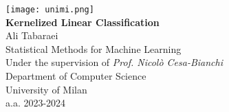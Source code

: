 
\newcommand{\ProjectTitle}{Kernelized Linear Classification}
\newcommand{\AuthorName}{Ali Tabaraei}
\newcommand{\CourseName}{Statistical Methods for Machine Learning}

\newcommand{\SupervisorName}{Nicolò Cesa-Bianchi}
\newcommand{\DepartmentName}{Department of Computer Science}
\newcommand{\UniversityName}{University of Milan}

\newcommand{\CurriculumPeriod}{2023-2024}
\newcommand{\CurriculumDate}{August 2024}


\begin{center}

    \texttt{[image: unimi.png]} \\
    \vspace*{5cm}
    \Large{\textbf{\ProjectTitle}} \\
    
    \vspace*{0.2cm}
    \large{\AuthorName} \\
    
    \vspace*{6cm}
    \CourseName \\
    Under the supervision of
    \textit{Prof. \SupervisorName} \\
    \DepartmentName \\
    \UniversityName \\
    
    \vfill
    a.a. \CurriculumPeriod 

\end{center}
\newpage